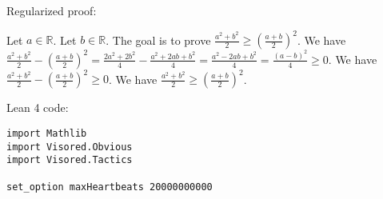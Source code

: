 \documentclass{article}
\begin{document}
Regularized proof:
\begin{tcolorbox}[colback=red!10, width=\linewidth]
Let $a\in\mathbb{R}$.
Let $b\in\mathbb{R}$.
The goal is to prove $\frac{a^2+b^2}{2} \ge {\left(\frac{a+b}{2}\right)}^2$.
We have $\frac{a^2+b^2}{2} - {\left(\frac{a+b}{2}\right)}^2 = \frac{2a^2+2b^2}{4} - \frac{a^2+2ab+b^2}{4} = \frac{a^2-2ab+b^2}{4} = \frac{{{(a-b)}}^2}{4} \ge 0$.
We have $\frac{a^2+b^2}{2} - {\left(\frac{a+b}{2}\right)}^2 \ge 0$.
We have $\frac{a^2+b^2}{2} \ge {\left(\frac{a+b}{2}\right)}^2$.
\end{tcolorbox}

Lean 4 code:
\begin{tcolorbox}[colback=white!10, width=\linewidth]
\begin{lstlisting}[language=Lean4]
import Mathlib
import Visored.Obvious
import Visored.Tactics

set_option maxHeartbeats 20000000000


\end{lstlisting}
\end{tcolorbox}
\end{document}

